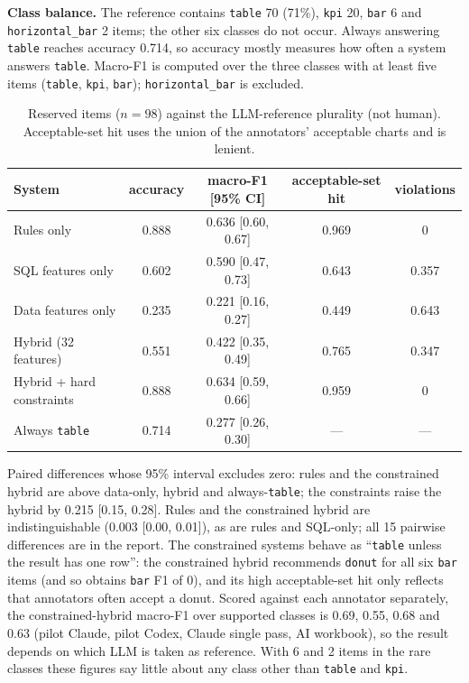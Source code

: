 \documentclass[11pt]{article}
\newcommand{\sql}[1]{\texttt{#1}}
\begin{document}
\textbf{Class balance.} The reference contains \sql{table} 70 (71\%), \sql{kpi} 20, \sql{bar} 6 and \sql{horizontal\_bar} 2 items; the other six classes do not occur. Always answering \sql{table} reaches accuracy 0.714, so accuracy mostly measures how often a system answers \sql{table}. Macro-F1 is computed over the three classes with at least five items (\sql{table}, \sql{kpi}, \sql{bar}); \sql{horizontal\_bar} is excluded.
\begin{table}[h]\centering\small
\begin{tabular}{lcccc}\toprule
System & accuracy & macro-F1 [95\% CI] & acceptable-set hit & violations\\\midrule
Rules only & 0.888 & 0.636 [0.60, 0.67] & 0.969 & 0\\
SQL features only & 0.602 & 0.590 [0.47, 0.73] & 0.643 & 0.357\\
Data features only & 0.235 & 0.221 [0.16, 0.27] & 0.449 & 0.643\\
Hybrid (32 features) & 0.551 & 0.422 [0.35, 0.49] & 0.765 & 0.347\\
Hybrid + hard constraints & 0.888 & 0.634 [0.59, 0.66] & 0.959 & 0\\
Always \sql{table} & 0.714 & 0.277 [0.26, 0.30] & --- & ---\\\bottomrule
\end{tabular}
\caption{Reserved items ($n=98$) against the LLM-reference plurality (not human). Acceptable-set hit uses the union of the annotators' acceptable charts and is lenient.}\label{tab:llmref}
\end{table}
Paired differences whose 95\% interval excludes zero: rules and the constrained hybrid are above data-only, hybrid and always-\sql{table}; the constraints raise the hybrid by 0.215 [0.15, 0.28]. Rules and the constrained hybrid are indistinguishable (0.003 [0.00, 0.01]), as are rules and SQL-only; all 15 pairwise differences are in the report. The constrained systems behave as ``\sql{table} unless the result has one row'': the constrained hybrid recommends \sql{donut} for all six \sql{bar} items (and so obtains \sql{bar} F1 of 0), and its high acceptable-set hit only reflects that annotators often accept a donut. Scored against each annotator separately, the constrained-hybrid macro-F1 over supported classes is 0.69, 0.55, 0.68 and 0.63 (pilot Claude, pilot Codex, Claude single pass, AI workbook), so the result depends on which LLM is taken as reference. With 6 and 2 items in the rare classes these figures say little about any class other than \sql{table} and \sql{kpi}.
\end{document}
